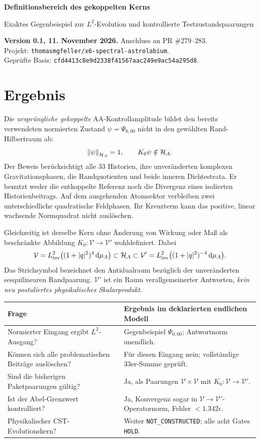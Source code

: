 \documentclass[10pt,a4paper]{article}
\newcommand{\HH}{\mathcal H_A}\newcommand{\VV}{\mathcal V}
\newcommand{\dd}{\,\mathrm d}\newcommand{\ii}{\mathrm i}
\begin{document}
{\color{ink}\LARGE\bfseries Definitionsbereich des gekoppelten Kerns}\par
{\large Exaktes Gegenbeispiel zur $L^2$-Evolution und kontrollierte Testzustandspaarungen}\par
\textbf{Version 0.1, 11. November 2026.} Anschluss an PR \#279--283.\\
Projekt: \texttt{thomasmgfeller/x6-spectral-astrolabium}.\\
Geprüfte Basis:
\texttt{cfd4413c8e9d2338f41567aac249e9ac54a295d8}.

\section*{Ergebnis}
Die \emph{ursprüngliche gekoppelte} AA-Kontrollamplitude bildet den bereits
verwendeten normierten Zustand $\psi=\Psi_{0,00}$ nicht in den gewählten
Rand-Hilbertraum ab:
\[
 \norm{\psi}_{\HH}=1,\qquad K_0\psi\notin\HH.
\]
Der Beweis berücksichtigt alle 33 Historien, ihre unveränderten komplexen
Gravitationsphasen, die Randquotienten und beide inneren Dichtestrata.
Er benutzt weder die entkoppelte Referenz noch die Divergenz eines isolierten
Historienbeitrags. Auf dem ausgehenden Atomsektor verbleiben zwei unterschiedliche
quadratische Feldphasen. Ihr Kreuzterm kann das positive, linear wachsende
Normquadrat nicht auslöschen.

Gleichzeitig ist derselbe Kern ohne Änderung von Wirkung oder Maß als beschränkte
Abbildung $K_0:\VV\to\VV'$ wohldefiniert. Dabei
\[
 \VV=L^2_{\rm inv}\bigl((1+|q|^2)^4\dd\mu_A\bigr)
 \subset\HH\subset
 \VV'=L^2_{\rm inv}\bigl((1+|q|^2)^{-4}\dd\mu_A\bigr).
\]
Das Strichsymbol bezeichnet den Antidualraum bezüglich der unveränderten
sesquilinearen Randpaarung. $\VV'$ ist ein Raum verallgemeinerter Antworten,
\emph{kein neu postuliertes physikalisches Skalarprodukt}.

\begin{center}\begin{tabular}{p{.40\linewidth}p{.51\linewidth}}\toprule
Frage & Ergebnis im deklarierten endlichen Modell\\\midrule
Normierter Eingang ergibt $L^2$-Ausgang? & Gegenbeispiel $\Psi_{0,00}$; Antwortnorm unendlich.\\
Können sich alle problematischen Beiträge auslöschen? & Für diesen Eingang nein; vollständige 33er-Summe geprüft.\\
Sind die bisherigen Paketpaarungen gültig? & Ja, als Paarungen $\VV\times\VV$ mit $K_0:\VV\to\VV'$.\\
Ist der Abel-Grenzwert kontrolliert? & Ja, Konvergenz sogar in $\VV\to\VV'$-Operatornorm, Fehler $<1.342\epsilon$.\\
Physikalischer CST-Evolutionskern? & Weiter \texttt{NOT\_CONSTRUCTED}; alle acht Gates \texttt{HOLD}.\\\bottomrule
\end{tabular}\end{center}
\end{document}
